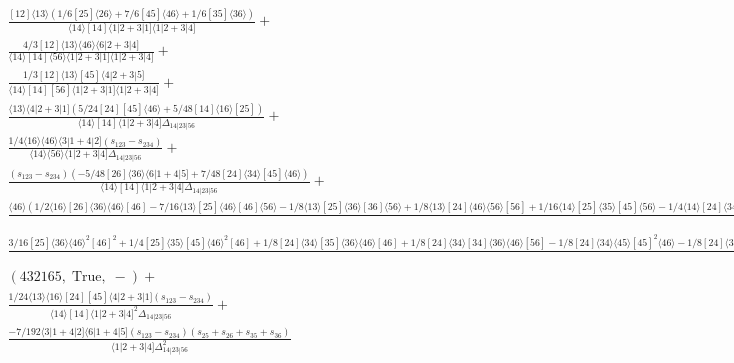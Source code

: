 \documentclass[varwidth, border=5pt]{standalone}
\begin{document}
\begin{my}
$\begin{gathered}
\scriptscriptstyle\frac{[12]⟨13⟩(1/6[25]⟨26⟩+7/6[45]⟨46⟩+1/6[35]⟨36⟩)}{⟨14⟩[14]⟨1|2+3|1]⟨1|2+3|4]}+\\
\scriptscriptstyle\frac{4/3[12]⟨13⟩⟨46⟩⟨6|2+3|4]}{⟨14⟩[14]⟨56⟩⟨1|2+3|1]⟨1|2+3|4]}+\\
\scriptscriptstyle\frac{1/3[12]⟨13⟩[45]⟨4|2+3|5]}{⟨14⟩[14][56]⟨1|2+3|1]⟨1|2+3|4]}+\\
\scriptscriptstyle\frac{⟨13⟩⟨4|2+3|1](5/24[24][45]⟨46⟩+5/48[14]⟨16⟩[25])}{⟨14⟩[14]⟨1|2+3|4]Δ_{14|23|56}}+\\
\scriptscriptstyle\frac{1/4⟨16⟩⟨46⟩⟨3|1+4|2](s_{123}-s_{234})}{⟨14⟩⟨56⟩⟨1|2+3|4]Δ_{14|23|56}}+\\
\scriptscriptstyle\frac{(s_{123}-s_{234})(-5/48[26]⟨36⟩⟨6|1+4|5]+7/48[24]⟨34⟩[45]⟨46⟩)}{⟨14⟩[14]⟨1|2+3|4]Δ_{14|23|56}}+\\
\scriptscriptstyle\frac{⟨46⟩(1/2⟨16⟩[26]⟨36⟩⟨46⟩[46]-7/16⟨13⟩[25]⟨46⟩[46]⟨56⟩-1/8⟨13⟩[25]⟨36⟩[36]⟨56⟩+1/8⟨13⟩[24]⟨46⟩⟨56⟩[56]+1/16⟨14⟩[25]⟨35⟩[45]⟨56⟩-1/4⟨14⟩[24]⟨34⟩[45]⟨56⟩+1/2⟨15⟩[25]⟨35⟩[45]⟨46⟩-1/8⟨13⟩[25]⟨35⟩[35]⟨56⟩-1/8⟨16⟩[26]⟨36⟩⟨56⟩[56]-1/2⟨15⟩[24]⟨36⟩⟨46⟩[56]-1/8⟨15⟩[25]⟨36⟩⟨56⟩[56]-1/16⟨13⟩[25]⟨45⟩[45]⟨56⟩+1/16⟨14⟩[25]⟨36⟩[46]⟨56⟩+1⟨15⟩[25]⟨36⟩⟨46⟩[46])}{⟨14⟩⟨56⟩⟨1|2+3|4]Δ_{14|23|56}}+\\
\scriptscriptstyle\frac{3/16[25]⟨36⟩⟨46⟩^2[46]^2+1/4[25]⟨35⟩[45]⟨46⟩^2[46]+1/8[24]⟨34⟩[35]⟨36⟩⟨46⟩[46]+1/8[24]⟨34⟩[34]⟨36⟩⟨46⟩[56]-1/8[24]⟨34⟩⟨45⟩[45]^2⟨46⟩-1/8[24]⟨34⟩⟨35⟩[35]^2⟨36⟩-1/8[24]⟨34⟩⟨35⟩[35][45]⟨46⟩-1/8⟨24⟩[24]^2⟨34⟩[45]⟨46⟩-1/8⟨23⟩[24][25]⟨45⟩[45]⟨46⟩-1/8⟨23⟩⟨24⟩[24]^2[25]⟨46⟩-1/8[25]⟨35⟩^2[35][45]⟨46⟩-1/16⟨24⟩^2[24]^2[25]⟨36⟩+1/16[25]⟨26⟩^2[26]^2⟨36⟩-1/4[24]⟨34⟩^2[34][45]⟨46⟩}{⟨14⟩[14]⟨1|2+3|4]Δ_{14|23|56}}+\\
\scriptscriptstyle(432165,\;\text{True},\;-)+\\
\scriptscriptstyle\frac{1/24⟨13⟩⟨16⟩[24][45]⟨4|2+3|1](s_{123}-s_{234})}{⟨14⟩[14]⟨1|2+3|4]^2Δ_{14|23|56}}+\\
\scriptscriptstyle\frac{-7/192⟨3|1+4|2]⟨6|1+4|5](s_{123}-s_{234})(s_{25}+s_{26}+s_{35}+s_{36})}{⟨1|2+3|4]Δ_{14|23|56}^2}\phantom{+}
\end{gathered}$
\end{my}
\end{document}
